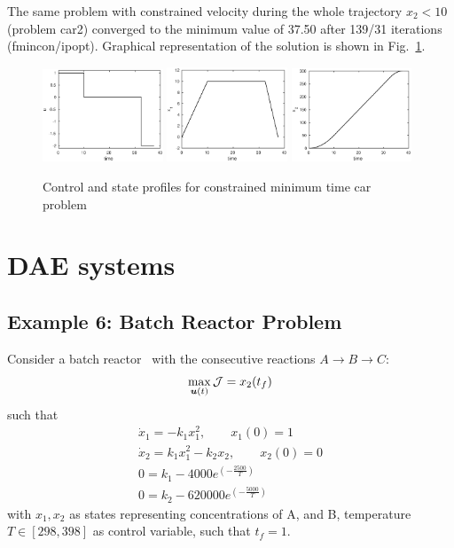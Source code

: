 The same problem with constrained velocity during the whole trajectory
$x_2 < 10$ (problem car2) converged to the minimum value of 37.50
after 139/31 iterations (fmincon/ipopt). Graphical representation of
the solution is shown in Fig.~\ref{fig:car2}.


\begin{figure}[htb]
\includegraphics[width=0.32\textwidth]{examples/problem-car2/car_u.eps}
\includegraphics[width=0.32\textwidth]{examples/problem-car2/car_x1.eps}
\includegraphics[width=0.32\textwidth]{examples/problem-car2/car_x2.eps}
\caption{Control and state profiles for
  constrained minimum time car problem} \label{fig:car2} 
\end{figure}

\section{DAE systems}
\label{sec:daes}

\subsection{Example 6: Batch Reactor Problem}
\label{sec:brpdae}

Consider a batch reactor~\citep{raj01,dad95} with the 
consecutive reactions $A \rightarrow B\rightarrow C$:
\begin{equation}
\max_{\ve{u}(t)} \mf{J} = x_{2}(t_{f}) \label{eq:batch_dae}
\end{equation}
such that
\begin{gather}
\dot{x}_{1} = -k_{1}x_{1}^{2}, \qquad x_1(0) = 1 \\
\dot{x}_{2} = k_{1}x_{1}^{2} - k_{2}x_{2}, \qquad x_2(0) = 0 \\
0 = k_{1} - 4000e^{(-\frac{2500}{T})} \\
0 = k_{2} - 620000e^{(-\frac{5000}{T})} 
\end{gather} with $x_{1}, x_{2}$ as states representing concentrations
of A, and B, temperature $T \in [298,398]$ as control variable, such
that $t_{f} = 1$.

